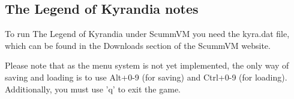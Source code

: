 \subsection{The Legend of Kyrandia notes}
To run The Legend of Kyrandia under ScummVM you need the kyra.dat file,
which can be found in the Downloads section of the ScummVM website.

Please note that as the menu system is not yet implemented, the
only way of saving and loading is to use Alt+0-9 (for saving) and
Ctrl+0-9 (for loading). Additionally, you must use 'q' to exit the
game.
